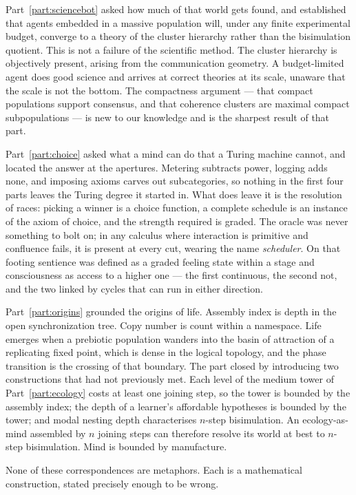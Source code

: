 Part~\ref{part:sciencebot} asked how much of that world gets found, and
established that agents embedded in a massive population will, under any
finite experimental budget, converge to a theory of the cluster hierarchy
rather than the bisimulation quotient.
This is not a failure of the scientific method.
The cluster hierarchy is objectively present, arising from the
communication geometry.
A budget-limited agent does good science and arrives at correct theories
at its scale, unaware that the scale is not the bottom.
The compactness argument --- that compact populations support consensus,
and that coherence clusters are maximal compact subpopulations --- is new
to our knowledge and is the sharpest result of that part.

Part~\ref{part:choice} asked what a mind can do that a Turing machine
cannot, and located the answer at the apertures.
Metering subtracts power, logging adds none, and imposing axioms carves
out subcategories, so nothing in the first four parts leaves the Turing
degree it started in.
What does leave it is the resolution of races: picking a winner is a
choice function, a complete schedule is an instance of the axiom of
choice, and the strength required is graded.
The oracle was never something to bolt on; in any calculus where
interaction is primitive and confluence fails, it is present at every
cut, wearing the name \emph{scheduler}.
On that footing sentience was defined as a graded feeling state within a
stage and consciousness as access to a higher one --- the first
continuous, the second not, and the two linked by cycles that can run in
either direction.

Part~\ref{part:origins} grounded the origins of life.
Assembly index is depth in the open synchronization tree.
Copy number is count within a namespace.
Life emerges when a prebiotic population wanders into the basin of
attraction of a replicating fixed point, which is dense in the logical
topology, and the phase transition is the crossing of that boundary.
The part closed by introducing two constructions that had not previously
met.
Each level of the medium tower of Part~\ref{part:ecology} costs at least
one joining step, so the tower is bounded by the assembly index; the
depth of a learner's affordable hypotheses is bounded by the tower; and
modal nesting depth characterises $n$-step bisimulation.
An ecology-as-mind assembled by $n$ joining steps can therefore resolve
its world at best to $n$-step bisimulation.
Mind is bounded by manufacture.

None of these correspondences are metaphors.
Each is a mathematical construction, stated precisely enough to be wrong.
